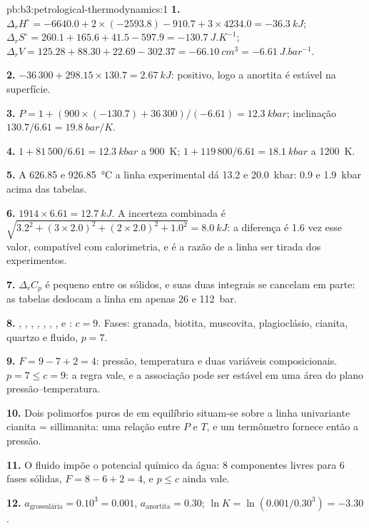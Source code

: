 \begin{solution}{pb:b3:petrological-thermodynamics:1}
\textbf{1.} $\Delta_rH^\circ = -6640.0 + 2\times(-2593.8) - 910.7 + 3\times4234.0
= \qty{-36.3}{kJ}$; $\Delta_rS^\circ = 260.1 + 165.6 + 41.5 - 597.9 =
\qty{-130.7}{J.K^{-1}}$; $\Delta_rV = 125.28 + 88.30 + 22.69 - 302.37 =
\qty{-66.10}{cm^3} = \qty{-6.61}{J.bar^{-1}}$.

\textbf{2.} $-36\,300 + 298.15\times130.7 = \qty{+2.67}{kJ}$: positivo, logo
a anortita é estável na superfície.

\textbf{3.} $P = 1 + (900\times(-130.7) + 36\,300)/(-6.61) = \qty{12.3}{kbar}$;
inclinação $130.7/6.61 = \qty{19.8}{bar/K}$.

\textbf{4.} $1 + 81\,500/6.61 = \qty{12.3}{kbar}$ a \qty{900}{K}; $1 +
119\,800/6.61 = \qty{18.1}{kbar}$ a \qty{1200}{K}.

\textbf{5.} A 626.85 e \qty{926.85}{\celsius} a linha experimental dá
13.2 e \qty{20.0}{kbar}: 0.9 e \qty{1.9}{kbar} acima das tabelas.

\textbf{6.} $1914\times6.61 = \qty{12.7}{kJ}$. A incerteza combinada é
$\sqrt{3.2^2 + (3\times2.0)^2 + (2\times2.0)^2 + 1.0^2} = \qty{8.0}{kJ}$: a
diferença é 1.6 vez esse valor, compatível com calorimetria, e é a razão de a
linha ser tirada dos experimentos.

\textbf{7.} $\Delta_rC_p$ é pequeno entre os sólidos, e suas duas integrais se
cancelam em parte: as tabelas deslocam a linha em apenas 26 e \qty{112}{bar}.

\textbf{8.} , , , , , ,
,  e : $c = 9$. Fases: granada, biotita,
 muscovita, plagioclásio, cianita, quartzo e fluido, $p = 7$.

\textbf{9.} $F = 9 - 7 + 2 = 4$: pressão, temperatura e duas
variáveis composicionais. $p = 7 \le c = 9$: a regra vale, e a associação pode ser estável
em uma área do plano pressão--temperatura.

\textbf{10.} Dois polimorfos puros de  em equilíbrio situam-se sobre a
linha univariante cianita = sillimanita: uma relação entre $P$ e $T$, e um
termômetro fornece então a pressão.

\textbf{11.} O fluido impõe o potencial químico da água: 8 componentes livres
para 6 fases sólidas, $F = 8 - 6 + 2 = 4$, e $p \le c$ ainda
vale.

\textbf{12.} $a_{\text{grossulária}} = 0.10^3 = 0.001$, $a_{\text{anortita}} =
0.30$; $\ln K = \ln(0.001/0.30^3) = -3.30$.


\end{solution}
